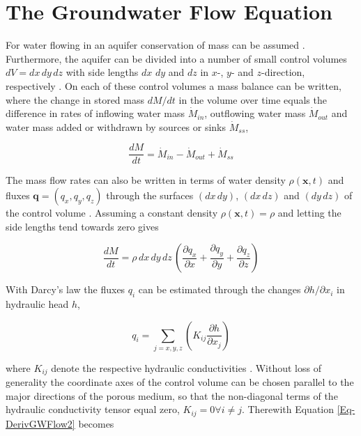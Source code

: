
\section{The Groundwater Flow Equation}
\label{Sec-GWFlowEq}

For water flowing in an aquifer conservation of mass can be assumed \parencite{Mays.2005}. Furthermore, the aquifer can be divided into a number of small control volumes $dV = dx \, dy \, dz$ with side lengths $dx$ $dy$ and $dz$ in $x$-, $y$- and $z$-direction, respectively \parencite{Fetter.2001}. On each of these control volumes a mass balance can be written, where the change in stored mass $dM / dt$ in the volume over time equals the difference in rates of inflowing water mass $\dot{M}_{in}$, outflowing water mass $\dot{M}_{out}$ and water mass added or withdrawn by sources or sinks $\dot{M}_{ss}$,

\begin{equation}
    \label{Eq-DerivGWFlow1}
    \frac{dM}{dt} = \dot{M}_{in} - \dot{M}_{out} + \dot{M}_{ss}
\end{equation}

The mass flow rates can also be written in terms of water density $\rho(\bm{x},t)$ and fluxes $\bm{q} = (q_x,q_y,q_z)$ through the surfaces $(dx \, dy)$, $(dx \, dz)$ and $(dy \, dz)$ of the control volume \parencite{Mays.2005}. Assuming a constant density $\rho(\bm{x},t) = \rho$ and letting the side lengths tend towards zero gives

\begin{equation}
    \label{Eq-DerivGWFlow2}
    \frac{dM}{dt} = \rho \, dx \, dy \, dz \, \left( \frac{\partial q_x}{\partial x} + \frac{\partial q_y}{\partial y} + \frac{\partial q_z}{\partial z} \right)
\end{equation}

With Darcy's law the fluxes $q_i$ can be estimated through the changes $\partial h / \partial x_i$ in hydraulic head $h$,

\begin{equation}
    \label{Eq-DerivGWFlow3}
    q_i = \sum_{j=x,y,z} \left( K_{ij} \frac{\partial h}{\partial x_j} \right)
\end{equation}

\noindent where $K_{ij}$ denote the respective hydraulic conductivities \parencite{Mays.2005}. Without loss of generality the coordinate axes of the control volume can be chosen parallel to the major directions of the porous medium, so that the non-diagonal terms of the hydraulic conductivity tensor equal zero, $K_{ij} = 0 \forall i \neq j$. Therewith Equation \eqref{Eq-DerivGWFlow2} becomes

